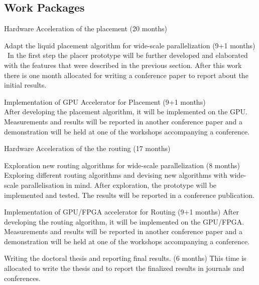 \documentclass[a4paper,oneside,12pt]{article}
\begin{document}
\subsection{Work Packages}
\begin{description*}
\item[Hardware Acceleration of the placement (20 months)]\

\begin{description*}
\item[Adapt the liquid placement algorithm for wide-scale parallelization (9+1 months)]\
In the first step the placer prototype will be further developed and elaborated with the features that were described in the previous section. After this work there is one month allocated for writing a conference paper to report about the initial results.
\item[Implementation of GPU Accelerator for Placement (9+1 months)]\
\\After developing the placement algorithm, it will be implemented on the GPU. Measurements and results will be reported in another conference paper and a demonstration will be held at one of the workshops accompanying a conference. 
\end{description*}

\item[Hardware Acceleration of the the routing (17 months)]\

\begin{description*}
\item[Exploration new routing algorithms for wide-scale parallelization (8 months)] 
Exploring different routing algorithms and devising new algorithms with wide-scale parallelisation in mind. After exploration, the prototype will be implemented and tested. The results will be reported in a conference publication.
\item[Implementation of GPU/FPGA accelerator for Routing (9+1 months)]
After developing the routing algorithm, it will be implemented on the GPU/FPGA. Measurements and results will be reported in another conference paper and a demonstration will be held at one of the workshops accompanying a conference. 
\end{description*}

\item[Writing the doctoral thesis and reporting final results. (6 months)] This time is allocated to write the thesis and to report the finalized results in journals and conferences.  

\end{description*}
\end{document}
